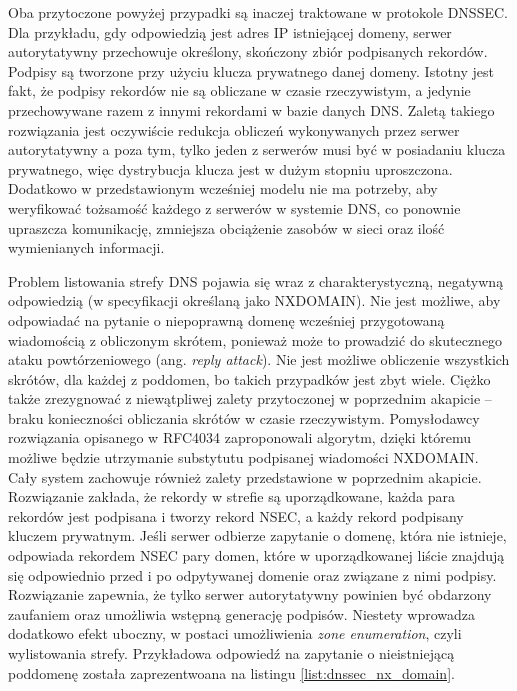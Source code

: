 Oba przytoczone powyżej przypadki są inaczej traktowane w protokole DNSSEC. Dla przykładu, gdy odpowiedzią jest
adres IP istniejącej domeny, serwer autorytatywny przechowuje określony, skończony zbiór podpisanych rekordów. Podpisy są tworzone
przy użyciu klucza prywatnego danej domeny. Istotny jest fakt, że podpisy rekordów nie są obliczane w czasie rzeczywistym, a jedynie
przechowywane razem z innymi rekordami w bazie danych DNS. Zaletą takiego rozwiązania jest oczywiście redukcja obliczeń wykonywanych
przez serwer autorytatywny a poza tym, tylko jeden z serwerów musi być w posiadaniu klucza prywatnego, więc dystrybucja klucza jest w
dużym stopniu uproszczona. Dodatkowo w przedstawionym wcześniej modelu nie ma potrzeby, aby weryfikować tożsamość każdego z serwerów
w systemie DNS, co ponownie upraszcza komunikację, zmniejsza obciążenie zasobów w sieci oraz ilość wymienianych informacji.

Problem listowania strefy DNS pojawia się wraz z charakterystyczną, negatywną odpowiedzią (w specyfikacji określaną jako NXDOMAIN).
Nie jest możliwe, aby odpowiadać na pytanie o niepoprawną domenę wcześniej przygotowaną wiadomością z obliczonym skrótem, ponieważ
może to prowadzić do skutecznego ataku powtórzeniowego (ang. \textit{reply attack}). Nie jest możliwe obliczenie wszystkich skrótów,
dla każdej z poddomen, bo takich przypadków jest zbyt wiele. Ciężko także zrezygnować z niewątpliwej zalety przytoczonej w poprzednim
akapicie -- braku konieczności obliczania skrótów w czasie rzeczywistym. Pomysłodawcy rozwiązania opisanego w RFC4034 \cite{RFC4034}
zaproponowali algorytm, dzięki któremu możliwe będzie utrzymanie substytutu podpisanej wiadomości NXDOMAIN. Cały system zachowuje
również zalety przedstawione w poprzednim akapicie. Rozwiązanie zakłada, że rekordy w strefie są uporządkowane, każda para rekordów
jest podpisana i tworzy rekord NSEC, a każdy rekord podpisany kluczem prywatnym. Jeśli serwer odbierze zapytanie o domenę, która
nie istnieje, odpowiada rekordem NSEC pary domen, które w uporządkowanej liście znajdują się odpowiednio przed i po odpytywanej
domenie oraz związane z nimi podpisy. Rozwiązanie zapewnia, że tylko serwer autorytatywny powinien być obdarzony zaufaniem oraz
umożliwia wstępną generację podpisów. Niestety wprowadza dodatkowo efekt uboczny, w postaci umożliwienia \textit{zone enumeration},
czyli wylistowania strefy. Przykładowa odpowiedź na zapytanie o nieistniejącą poddomenę została zaprezentwoana na listingu
\ref{list:dnssec_nx_domain}.

